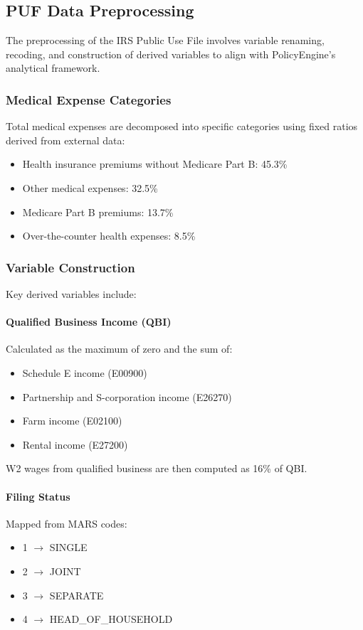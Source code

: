 \subsection{PUF Data Preprocessing}

The preprocessing of the IRS Public Use File involves variable renaming, recoding, and construction of derived variables to align with PolicyEngine's analytical framework.

\subsubsection{Medical Expense Categories}

Total medical expenses are decomposed into specific categories using fixed ratios derived from external data:

\begin{itemize}
    \item Health insurance premiums without Medicare Part B: 45.3\%
    \item Other medical expenses: 32.5\%
    \item Medicare Part B premiums: 13.7\%
    \item Over-the-counter health expenses: 8.5\%
\end{itemize}

\subsubsection{Variable Construction}

Key derived variables include:

\paragraph{Qualified Business Income (QBI)}
Calculated as the maximum of zero and the sum of:
\begin{itemize}
    \item Schedule E income (E00900)
    \item Partnership and S-corporation income (E26270)
    \item Farm income (E02100)
    \item Rental income (E27200)
\end{itemize}

W2 wages from qualified business are then computed as 16\% of QBI.

\paragraph{Filing Status}
Mapped from MARS codes:
\begin{itemize}
    \item 1 $\rightarrow$ SINGLE
    \item 2 $\rightarrow$ JOINT
    \item 3 $\rightarrow$ SEPARATE
    \item 4 $\rightarrow$ HEAD\_OF\_HOUSEHOLD
\end{itemize}

